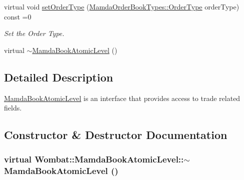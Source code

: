 \begin{CompactItemize}
virtual void \hyperlink{classWombat_1_1MamdaBookAtomicLevel_6b9fa11952fb136aceda2810f3131aeb}{set\-Order\-Type} (\hyperlink{classWombat_1_1MamdaOrderBookTypes_b1b75d93c83c5a1042c392ab46a27291}{Mamda\-Order\-Book\-Types::Order\-Type} order\-Type) const =0
\begin{CompactList}\small\item\em Set the Order Type. \item\end{CompactList}\item 
virtual \hyperlink{classWombat_1_1MamdaBookAtomicLevel_99b1bdf06263710172d794c9b0e08563}{$\sim$Mamda\-Book\-Atomic\-Level} ()
\end{CompactItemize}


\subsection{Detailed Description}
\hyperlink{classWombat_1_1MamdaBookAtomicLevel}{Mamda\-Book\-Atomic\-Level} is an interface that provides access to trade related fields. 



\subsection{Constructor \& Destructor Documentation}
\hypertarget{classWombat_1_1MamdaBookAtomicLevel_99b1bdf06263710172d794c9b0e08563}{
\subsubsection[$\sim$MamdaBookAtomicLevel]{\setlength{\rightskip}{0pt plus 5cm}virtual Wombat::Mamda\-Book\-Atomic\-Level::$\sim$Mamda\-Book\-Atomic\-Level ()}}
\label{classWombat_1_1MamdaBookAtomicLevel_99b1bdf06263710172d794c9b0e08563}




